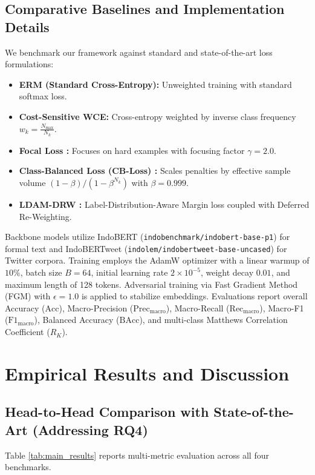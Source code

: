 \documentclass[final,5p,times,twocolumn]{elsarticle}
\begin{document}
\subsection{Comparative Baselines and Implementation Details}
We benchmark our framework against standard and state-of-the-art loss formulations:
\begin{itemize}
    \item \textbf{ERM (Standard Cross-Entropy):} Unweighted training with standard softmax loss.
    \item \textbf{Cost-Sensitive WCE:} Cross-entropy weighted by inverse class frequency $w_k = \frac{N_{\max}}{N_k}$.
    \item \textbf{Focal Loss \cite{lin2017focal}:} Focuses on hard examples with focusing factor $\gamma = 2.0$.
    \item \textbf{Class-Balanced Loss (CB-Loss) \cite{cui2019class}:} Scales penalties by effective sample volume $(1-\beta)/(1-\beta^{N_k})$ with $\beta = 0.999$.
    \item \textbf{LDAM-DRW \cite{cao2019learning}:} Label-Distribution-Aware Margin loss coupled with Deferred Re-Weighting.
\end{itemize}

Backbone models utilize IndoBERT (\texttt{indobenchmark/indobert-base-p1}) for formal text and IndoBERTweet (\texttt{indolem/indobertweet-base-uncased}) for Twitter corpora. Training employs the AdamW optimizer with a linear warmup of $10\%$, batch size $B=64$, initial learning rate $2 \times 10^{-5}$, weight decay $0.01$, and maximum length of 128 tokens. Adversarial training via Fast Gradient Method (FGM) \cite{miyato2018virtual} with $\epsilon = 1.0$ is applied to stabilize embeddings. Evaluations report overall Accuracy ($\text{Acc}$), Macro-Precision ($\text{Prec}_{\text{macro}}$), Macro-Recall ($\text{Rec}_{\text{macro}}$), Macro-F1 ($\text{F1}_{\text{macro}}$), Balanced Accuracy ($\text{BAcc}$), and multi-class Matthews Correlation Coefficient ($R_K$).

\section{Empirical Results and Discussion}
\label{sec:results}

\subsection{Head-to-Head Comparison with State-of-the-Art (Addressing RQ4)}
Table \ref{tab:main_results} reports multi-metric evaluation across all four benchmarks. 
\end{document}
